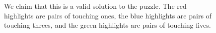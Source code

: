 \documentclass[10pt]{../usamts}
\begin{document}
\begin{solution}
\begin{figure}[htbp]
    \caption{We claim that this is a valid solution to the puzzle. The red highlights are pairs of touching ones, the blue highlights are pairs of touching threes, and the green highlights are pairs of touching fives.}
\end{figure}
\end{solution}
\end{document}

